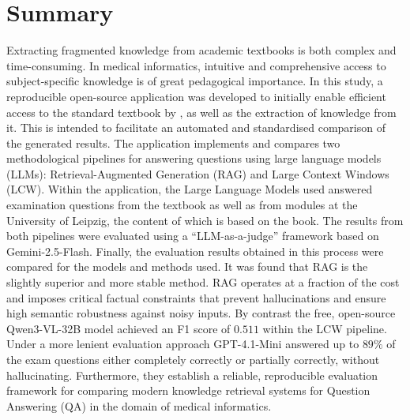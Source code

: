 \chapter*{Summary}
Extracting fragmented knowledge from academic textbooks is both complex and time-consuming.
In medical informatics, intuitive and comprehensive access to subject-specific knowledge is of great pedagogical importance.
In this study, a reproducible open-source application was developed to initially enable efficient access to the standard textbook  by \citet{bb2}, as well as the extraction of knowledge from it.
This is intended to facilitate an automated and standardised comparison of the generated results.
The application implements and compares two methodological pipelines for answering questions using large language models (LLMs): Retrieval-Augmented Generation (RAG) and Large Context Windows (LCW).
Within the application, the Large Language Models used answered examination questions from the textbook as well as from modules at the University of Leipzig, the content of which is based on the book.
The results from both pipelines were evaluated using a \enquote{LLM-as-a-judge} framework based on Gemini-2.5-Flash.
Finally, the evaluation results obtained in this process were compared for the models and methods used.
It was found that RAG is the slightly superior and more stable method.
RAG operates at a fraction of the cost and imposes critical factual constraints that prevent hallucinations and ensure high semantic robustness against noisy inputs.
By contrast the free, open-source Qwen3-VL-32B model achieved an F1 score of $0.511$ within the LCW pipeline.
Under a more lenient evaluation approach GPT-4.1-Mini answered up to $89\%$ of the exam questions either completely correctly or partially correctly, without hallucinating.
Furthermore, they establish a reliable, reproducible evaluation framework for comparing modern knowledge retrieval systems for Question Answering (QA) in the domain of medical informatics.
\vfill
